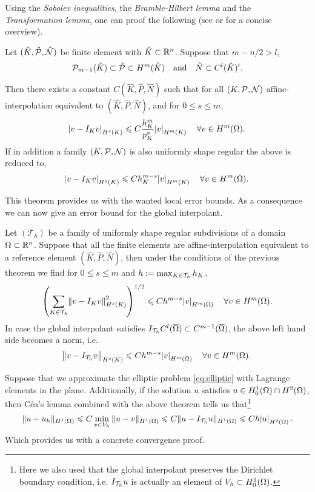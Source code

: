 \documentclass[thesis.tex]{subfiles}
\begin{document}
  Using the \emph{Sobolev inequalities}, the \emph{Bramble-Hilbert lemma} and the \emph{Transformation lemma}, one
  can proof the following (see \cite[Ch~3]{chen} or \cite{stevenson} for a concise overview).
  \begin{thm}
    Let $(\hat K, \hat \P, \hat \N)$ be finite element with $\hat K \subset \R^n$. Suppose that $m - n/ 2 > l$,
    \[
      \P_{m-1}(\hat K) \subset \hat \P \subset H^m(\hat K) \quad \text{and} \quad \hat N \subset  C^l(\hat K)'.
    \]
    
    Then there exists a constant $C(\hat K, \hat P, \hat N)$ such that for all $(K, \P, \N)$ affine-interpolation
      equivalent to $(\hat K, \hat P, \hat N)$, and for $0 \leq s \leq m$,
      \[
        \abs{v - I_K v}_{H^s(K)} \leq C \frac{h_K^{m}}{p_K^s} \abs{v}_{H^m(K)} \quad  \forall v \in H^m(\O).
      \]
      If in addition a family $(K, \P, \N)$ is also uniformly shape regular the above is reduced to,
      \[
        \abs{v - I_K v}_{H^s(K)} \leq C h_K^{m -s} \abs{v}_{H^m(K)} \quad \forall v \in H^m(\O).
      \]
  \end{thm}
  This theorem provides us with the wanted local error bounds. As a consequence we can now
  give an error bound for the global interpolant.
  \begin{thm}
    Let $(\mathcal{T}_h)$ be a family of uniformly shape regular subdivisions of a domain~$\O \subset \R^n$.
    Suppose that all the finite elements are affine-interpolation equivalent to a reference element $(\hat K, \hat P, \hat N)$,
    then under the conditions of the previous theorem we find for $0 \leq s \leq m$ and $h  := \max_{ K \in \T_h} h_K$,
    \[
      \left( \sum_{K \in \T_h} \norm{v - I_K v}^2_{H^s(K)}\right)^{1/2} \leq C h^{m-s} \abs{v}_{H^m(\O)} \quad \forall v \in H^m(\Omega).
    \]
    In case the global interpolant satisfies $I_{\T_h} C^l(\OO) \subset C^{m-1}(\OO)$, the above left hand side becomes a norm, i.e. 
    \[
      \norm{v - I_{\T_h}v}_{H^s(K)} \leq C h^{m-s} \abs{v}_{H^m(\O)} \quad \forall v \in H^m(\Omega).
    \]
  \end{thm}
  Suppose that we approximate the elliptic problem \eqref{eq:elliptic} with Lagrange elements in the plane. Additionally, if
  the solution $u$ satisfies $u \in H_0^1(\O)\cap H^2(\O)$, then C\'ea's lemma combined with the above theorem tells us that\footnote{
  Here we also used that the global interpolant preserves the Dirichlet boundary condition, i.e.
   $I_{\T_h} u$ is actually an element of $V_h \subset H_0^1(\O)$.}
  \begin{equation}
    \label{eq:conv_h}
    \|u - u_h\|_{H^1(\O)} \leq C \min_{v \in V_h} \| u - v\|_{H^1(\O)} \leq C \| u - I_{\T_h}u \|_{H^1(\O)} \leq C h \abs{u}_{H^2(\O)}.
  \end{equation}
  Which provides us with a concrete convergence proof. 
\end{document}
